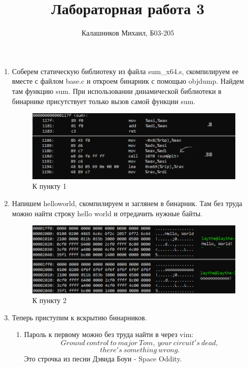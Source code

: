 \documentclass[a4paper,12pt]{article}
\title{Лабораторная работа 3}
\author{Калашников Михаил, Б03-205}
\date{}
\begin{document}

\begin{enumerate}

\setcounter{enumi}{0}

\item Соберем статическую библиотеку из файла sum\_x64.s, скомпилируем ее вместе с файлом base.c и откроем бинарник с помощью objdump. Найдем там функцию sum. При использовании динамической библиотеки в бинарнике присутствует только вызов самой функции sum.

\begin{figure}[h!]
  \centering
  \includegraphics[width=0.8\linewidth]{images/asm3_1.png}
  \caption{К пункту 1}
\end{figure}

\item Напишем helloworld, скомпилируем и заглянем в бинарник. Там без труда можно найти строку hello world и отредачить нужные байты.

\begin{figure}[h!]
  \centering
  \includegraphics[width=0.8\linewidth]{images/asm3_2.png}
  \caption{К пункту 2}
\end{figure}

\item Теперь приступим к вскрытию бинарников. 

\begin{enumerate}

\item Пароль к первому можно без труда найти в через vim:
\[Ground\ control\ to\ major\ Tom,\ your\ circuit's\ dead,\]
\[there's\ something\ wrong.\]
Это строчка из песни Дэвида Боуи - Space Oddity.


\end{enumerate}
\end{enumerate}
\end{document}
